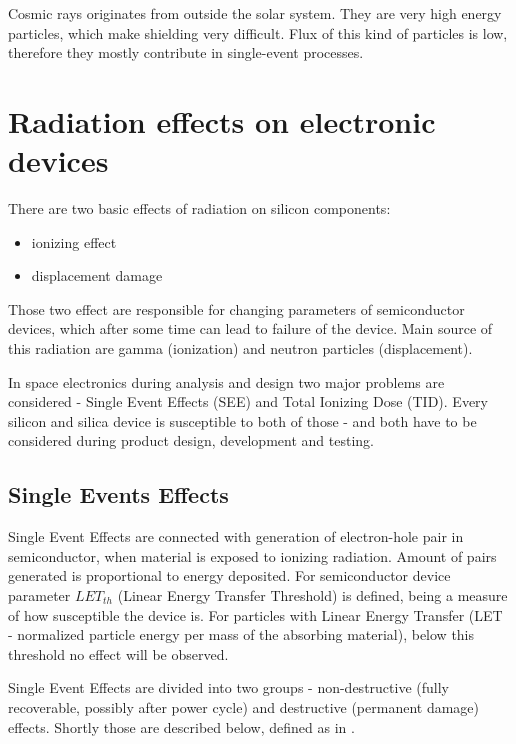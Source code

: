     Cosmic rays originates from outside the solar system. They are very high energy particles, which make shielding very difficult. Flux of this kind of particles is low, therefore they mostly contribute in single-event processes.

\section{Radiation effects on electronic devices}
    There are two basic effects of radiation on silicon components:
    \begin{itemize}
        \item ionizing effect
        \item displacement damage
    \end{itemize}

    Those two effect are responsible for changing parameters of semiconductor devices, which after some time can lead to failure of the device. Main source of this radiation are gamma (ionization) and neutron particles (displacement).

    In space electronics during analysis and design two major problems are considered - Single Event Effects (SEE) and Total Ionizing Dose (TID). Every silicon and silica device is susceptible to both of those - and both have to be considered during product design, development and testing.

    \subsection{Single Events Effects}
        Single Event Effects are connected with generation of electron-hole pair in semiconductor, when material is exposed to ionizing radiation. Amount of pairs generated is proportional to energy deposited. For semiconductor device parameter $LET_{th}$ (Linear Energy Transfer Threshold) is defined, being a measure of how susceptible the device is. For particles with Linear Energy Transfer (LET - normalized particle energy per mass of the absorbing material), below this threshold no effect will be observed.

        Single Event Effects are divided into two groups - non-destructive (fully recoverable, possibly after power cycle) and destructive (permanent damage) effects. Shortly those are described below, defined as in \cite{ECSS_Q_ST_60_15C}.

